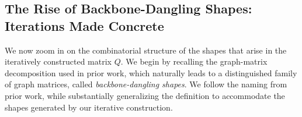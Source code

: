 \documentclass[12pt]{article}
\newtheorem{lemma}[theorem]{Lemma}
\newcommand{\gam}{\gamma}
\newcommand{\cm}{\mathsf{M} }
\newcommand{\fp}{\mathsf{P}}
\newcommand{\q}{\mathfrak q}
\begin{document}
%
%
%
\subsection{The Rise of Backbone-Dangling Shapes: Iterations Made Concrete}
We now zoom in on the combinatorial structure of the shapes that arise in the iteratively constructed matrix \(Q\). We begin by recalling the graph-matrix decomposition used in prior work, which naturally leads to a distinguished family of graph matrices, called \emph{backbone-dangling shapes}. We follow the naming from prior work, while substantially generalizing the definition to accommodate the shapes generated by our iterative construction.
\end{document}
